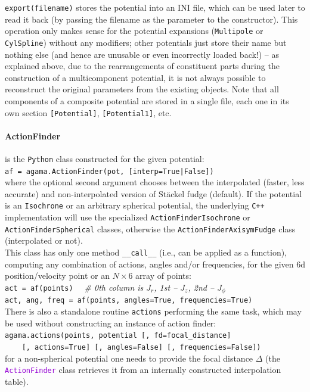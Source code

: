 \documentclass[12pt]{article}
\newcommand{\Cpp}  {\texttt{C++}\xspace}
\newcommand{\Python}{\texttt{Python}\xspace}
\newcommand{\ttt}[1]{\textcolor{darkviolet}{\texttt{#1}}}
\newcommand{\ppp}[1]{\textcolor{darkolive} {\texttt{#1}}}
\let\oldparagraph\paragraph
\renewcommand{\paragraph}[1]{\vspace{-2mm}\oldparagraph{#1}}
\begin{document}
\texttt{export(filename)} stores the potential into an INI file, which can be used later to read it back (by passing the filename as the parameter to the constructor). This operation only makes sense for the potential expansions (\ppp{Multipole} or \ppp{CylSpline}) without any modifiers; other potentials just store their name but nothing else (and hence are unusable or even incorrectly loaded back!) -- as explained above, due to the rearrangements of constituent parts during the construction of a multicomponent potential, it is not always possible to reconstruct the original parameters from the existing objects. Note that all components of a composite potential are stored in a single file, each one in its own section \texttt{[Potential]}, \texttt{[Potential1]}, etc.

\paragraph{ActionFinder} is the \Python class constructed for the given potential:\\
\texttt{af = agama.ActionFinder(pot, [interp=True|False])}\\
where the optional second argument chooses between the interpolated (faster, less accurate) and non-interpolated version of St\"ackel fudge (default). If the potential is an \ppp{Isochrone} or an arbitrary spherical potential, the underlying \Cpp implementation will use the specialized \ppp{ActionFinderIsochrone} or \ppp{ActionFinderSpherical} classes, otherwise the \ppp{ActionFinder\-AxisymFudge} class (interpolated or not).\\
This class has only one method \texttt{__call__} (i.e., can be applied as a function), computing any combination of actions, angles and/or frequencies, for the given 6d position/velocity point or an $N\times6$ array of points:\\[1mm]
\texttt{act = af(points)}
\textit{\color{Sepia}\ \ \# 0th column is $J_r$, 1st -- $J_z$, 2nd -- $J_\phi$} \\
\texttt{act, ang, freq = af(points, angles=True, frequencies=True)}\\[2mm]
There is also a standalone routine \texttt{actions} performing the same task, which may be used without constructing an instance of action finder:\\[1mm]
\texttt{agama.actions(points, potential [, fd=focal_distance]}\\
\texttt{\mbox{}~~~~[, actions=True] [, angles=False] [, frequencies=False])}\\[1mm]
for a non-spherical potential one needs to provide the focal distance $\Delta$ (the \ttt{ActionFinder} class retrieves it from an internally constructed interpolation table).
\end{document}
